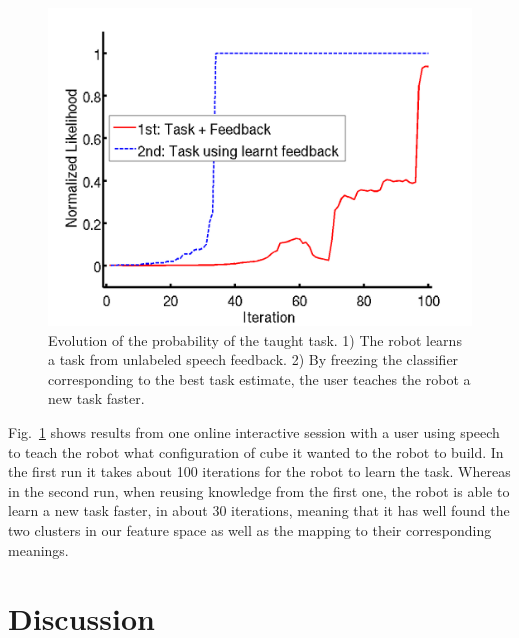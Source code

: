 \documentclass[conference]{IEEEtran}
\begin{document}
\begin{figure}[!h]
	\centering
		\includegraphics[width=0.9\columnwidth]{images/real}
	\caption{Evolution of the probability of the taught task. 1) The robot learns a task from unlabeled speech feedback. 2) By freezing the classifier corresponding to the best task estimate, the user teaches the robot a new task faster.}
	\label{Real}
\end{figure}


Fig.~\ref{Real} shows results from one online interactive session with a user using speech to teach the robot what configuration of cube it wanted to the robot to build. In the first run it takes about 100 iterations for the robot to learn the task. Whereas in the second run, when reusing knowledge from the first one, the robot is able to learn a new task faster, in about 30 iterations, meaning that it has well found the two clusters in our feature space as well as the mapping to their corresponding meanings.


\section{Discussion}
\end{document}

